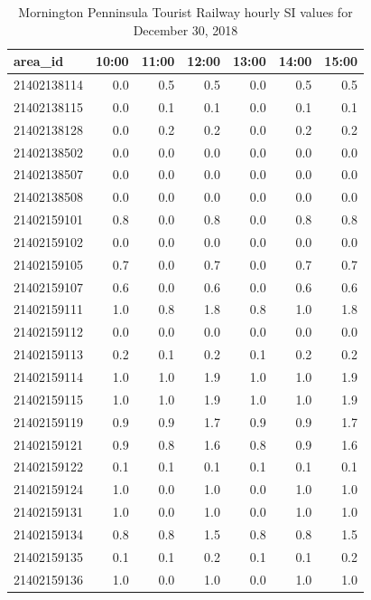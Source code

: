 \documentclass[preprint, 3p,
authoryear]{elsarticle} %
\begin{document}
\begin{table}

\caption{\label{tab:SI_mornington_20181230_output}Mornington Penninsula Tourist Railway hourly SI values for December 30, 2018}
\centering
\begin{tabular}[t]{l|r|r|r|r|r|r}
\hline
area\_id & 10:00 & 11:00 & 12:00 & 13:00 & 14:00 & 15:00\\
\hline
21402138114 & 0.0 & 0.5 & 0.5 & 0.0 & 0.5 & 0.5\\
\hline
21402138115 & 0.0 & 0.1 & 0.1 & 0.0 & 0.1 & 0.1\\
\hline
21402138128 & 0.0 & 0.2 & 0.2 & 0.0 & 0.2 & 0.2\\
\hline
21402138502 & 0.0 & 0.0 & 0.0 & 0.0 & 0.0 & 0.0\\
\hline
21402138507 & 0.0 & 0.0 & 0.0 & 0.0 & 0.0 & 0.0\\
\hline
21402138508 & 0.0 & 0.0 & 0.0 & 0.0 & 0.0 & 0.0\\
\hline
21402159101 & 0.8 & 0.0 & 0.8 & 0.0 & 0.8 & 0.8\\
\hline
21402159102 & 0.0 & 0.0 & 0.0 & 0.0 & 0.0 & 0.0\\
\hline
21402159105 & 0.7 & 0.0 & 0.7 & 0.0 & 0.7 & 0.7\\
\hline
21402159107 & 0.6 & 0.0 & 0.6 & 0.0 & 0.6 & 0.6\\
\hline
21402159111 & 1.0 & 0.8 & 1.8 & 0.8 & 1.0 & 1.8\\
\hline
21402159112 & 0.0 & 0.0 & 0.0 & 0.0 & 0.0 & 0.0\\
\hline
21402159113 & 0.2 & 0.1 & 0.2 & 0.1 & 0.2 & 0.2\\
\hline
21402159114 & 1.0 & 1.0 & 1.9 & 1.0 & 1.0 & 1.9\\
\hline
21402159115 & 1.0 & 1.0 & 1.9 & 1.0 & 1.0 & 1.9\\
\hline
21402159119 & 0.9 & 0.9 & 1.7 & 0.9 & 0.9 & 1.7\\
\hline
21402159121 & 0.9 & 0.8 & 1.6 & 0.8 & 0.9 & 1.6\\
\hline
21402159122 & 0.1 & 0.1 & 0.1 & 0.1 & 0.1 & 0.1\\
\hline
21402159124 & 1.0 & 0.0 & 1.0 & 0.0 & 1.0 & 1.0\\
\hline
21402159131 & 1.0 & 0.0 & 1.0 & 0.0 & 1.0 & 1.0\\
\hline
21402159134 & 0.8 & 0.8 & 1.5 & 0.8 & 0.8 & 1.5\\
\hline
21402159135 & 0.1 & 0.1 & 0.2 & 0.1 & 0.1 & 0.2\\
\hline
21402159136 & 1.0 & 0.0 & 1.0 & 0.0 & 1.0 & 1.0\\

\end{tabular}
\end{table}
\end{document}
